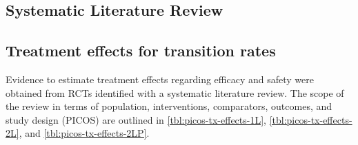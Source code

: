 \documentclass[11pt,final,fleqn]{article}\usepackage[]{graphicx}\usepackage[]{color}
\theoremstyle{plain}
\begin{document}
\begin{appendices}
\section{Systematic Literature Review}\label{app:slr}

\subsection{Treatment effects for transition rates}
Evidence to estimate treatment effects regarding efficacy and safety were obtained from RCTs identified with a systematic literature review. The scope of the review in terms of population, interventions, comparators, outcomes, and study design (PICOS) are outlined in \autoref{tbl:picos-tx-effects-1L}, \autoref{tbl:picos-tx-effects-2L}, and \autoref{tbl:picos-tx-effects-2LP}. 


\end{appendices}
\end{document}
